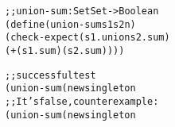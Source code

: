 \documentclass[12pt]{article}                   %
\newenvironment{solution}{\color{Red}}{}
\begin{document}
\begin{problem}
\begin{enumerate}
\end{enumerate}

\begin{solution}
\begin{alltt}
;; union-sum : Set Set -> Boolean
(define (union-sum s1 s2 n)
  (check-expect (s1 . union s2 . sum)
                (+ (s1 . sum) (s2 . sum))))

;; successful test
(union-sum (new singleton% 17) e)
;; It's false, counterexample:
(union-sum (new singleton% 17) (new singleton% 17))
\end{alltt}
\end{solution}

\newpage
\ifrubric{}
\newpage
\fi
\end{problem}
\end{document}
